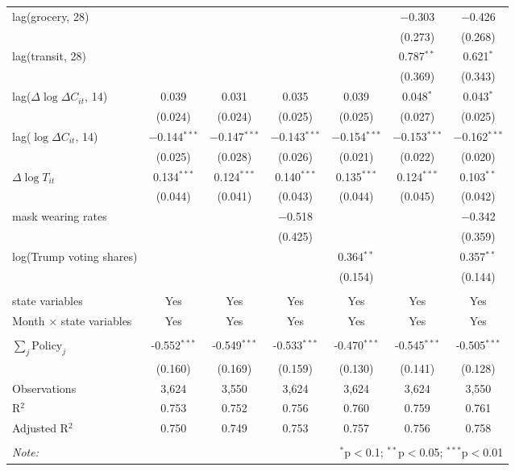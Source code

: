 \begin{tabular}{@{\extracolsep{1pt}}lcccccc}
  lag(grocery, 28) &  &  &  &  & $-$0.303 & $-$0.426 \\ 
  &  &  &  &  & (0.273) & (0.268) \\ 
  lag(transit, 28) &  &  &  &  & 0.787$^{**}$ & 0.621$^{*}$ \\ 
  &  &  &  &  & (0.369) & (0.343) \\ 
  lag($\Delta \log \Delta C_{it}$, 14) & 0.039 & 0.031 & 0.035 & 0.039 & 0.048$^{*}$ & 0.043$^{*}$ \\ 
  & (0.024) & (0.024) & (0.025) & (0.025) & (0.027) & (0.025) \\ 
  lag($\log \Delta C_{it}$, 14) & $-$0.144$^{***}$ & $-$0.147$^{***}$ & $-$0.143$^{***}$ & $-$0.154$^{***}$ & $-$0.153$^{***}$ & $-$0.162$^{***}$ \\ 
  & (0.025) & (0.028) & (0.026) & (0.021) & (0.022) & (0.020) \\ 
  $\Delta \log T_{it}$ & 0.134$^{***}$ & 0.124$^{***}$ & 0.140$^{***}$ & 0.135$^{***}$ & 0.124$^{***}$ & 0.103$^{**}$ \\ 
  & (0.044) & (0.041) & (0.043) & (0.044) & (0.045) & (0.042) \\ 
  mask wearing rates &  &  & $-$0.518 &  &  & $-$0.342 \\ 
  &  &  & (0.425) &  &  & (0.359) \\ 
  log(Trump voting shares) &  &  &  & 0.364$^{**}$ &  & 0.357$^{**}$ \\ 
  &  &  &  & (0.154) &  & (0.144) \\ 
 \hline \\[-1.8ex] 
state variables & Yes & Yes & Yes & Yes & Yes & Yes \\ 
Month $\times$ state variables & Yes & Yes & Yes & Yes & Yes & Yes \\ 
\hline \\[-1.8ex] 
$\sum_j \mathrm{Policy}_j$ & -0.552$^{***}$ & -0.549$^{***}$ & -0.533$^{***}$ & -0.470$^{***}$ & -0.545$^{***}$ & -0.505$^{***}$ \\ 
 & (0.160) & (0.169) & (0.159) & (0.130) & (0.141) & (0.128) \\ 
Observations & 3,624 & 3,550 & 3,624 & 3,624 & 3,624 & 3,550 \\ 
R$^{2}$ & 0.753 & 0.752 & 0.756 & 0.760 & 0.759 & 0.761 \\ 
Adjusted R$^{2}$ & 0.750 & 0.749 & 0.753 & 0.757 & 0.756 & 0.758 \\ 
\hline 
\hline \\[-1.8ex] 
\textit{Note:}  & \multicolumn{6}{r}{$^{*}$p$<$0.1; $^{**}$p$<$0.05; $^{***}$p$<$0.01} \\ 
\end{tabular} 